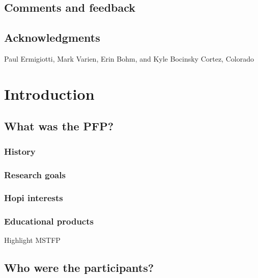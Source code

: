 \documentclass[12pt,]{krantz}
\theoremstyle{definition}
\theoremstyle{definition}
\theoremstyle{definition}
\theoremstyle{remark}
\let\BeginKnitrBlock\begin \let\EndKnitrBlock\end
\begin{document}
\hypertarget{comments-and-feedback}{%
\section*{Comments and feedback}\label{comments-and-feedback}}


\hypertarget{acknowledgments}{%
\section*{Acknowledgments}\label{acknowledgments}}


\BeginKnitrBlock{flushright}
Paul Ermigiotti, Mark Varien, Erin Bohm, and Kyle Bocinsky Cortez,
Colorado
\EndKnitrBlock{flushright}

\mainmatter

\hypertarget{introduction}{%
\chapter{Introduction}\label{introduction}}

\hypertarget{what-was-the-pfp}{%
\section{What was the PFP?}\label{what-was-the-pfp}}

\hypertarget{history}{%
\subsection*{History}\label{history}}


\hypertarget{research-goals}{%
\subsection*{Research goals}\label{research-goals}}


\hypertarget{hopi-interests}{%
\subsection*{Hopi interests}\label{hopi-interests}}


\hypertarget{educational-products}{%
\subsection*{Educational products}\label{educational-products}}


Highlight MSTFP

\hypertarget{who-were-the-participants}{%
\section{Who were the participants?}\label{who-were-the-participants}}
\end{document}
